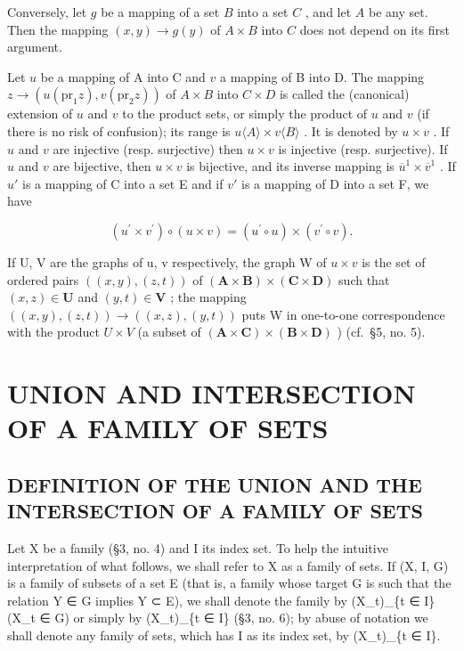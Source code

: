 Conversely, let \(g\) be a mapping of a set \(B\) into a set \(C\) , and let \(A\) be any set. Then the mapping \((x, y) \to g(y)\) of \(A \times B\) into \(C\) does not depend on its first argument.

Let \(u\) be a mapping of A into C and \(v\) a mapping of B into D. The mapping \(z \to (u(\mathrm{pr}_1z), v(\mathrm{pr}_2z))\) of \(A \times B\) into \(C \times D\) is called the (canonical) extension of \(u\) and \(v\) to the product sets, or simply the product of \(u\) and \(v\) (if there is no risk of confusion); its range is \(u\langle A\rangle \times v\langle B\rangle\) . It is denoted by \(u \times v\) . If \(u\) and \(v\) are injective (resp. surjective) then \(u \times v\) is injective (resp. surjective). If \(u\) and \(v\) are bijective, then \(u \times v\) is bijective, and its inverse mapping is \(\overline{u}^1 \times \overline{v}^1\) . If \(u'\) is a mapping of C into a set E and if \(v'\) is a mapping of D into a set F, we have

\[
\left(u ^ {\prime} \times v ^ {\prime}\right) \circ (u \times v) = \left(u ^ {\prime} \circ u\right) \times \left(v ^ {\prime} \circ v\right).
\]

If U, V are the graphs of u, v respectively, the graph W of \(u \times v\) is the set of ordered pairs \(((x, y), (z, t))\) of \((\mathbf{A} \times \mathbf{B}) \times (\mathbf{C} \times \mathbf{D})\) such that \((x, z) \in \mathbf{U}\) and \((y, t) \in \mathbf{V}\) ; the mapping \(((x, y), (z, t)) \to ((x, z), (y, t))\) puts W in one-to-one correspondence with the product \(U \times V\) (a subset of \((\mathbf{A} \times \mathbf{C}) \times (\mathbf{B} \times \mathbf{D})\) ) (cf.~§5, no. 5).

\section{UNION AND INTERSECTION OF A FAMILY OF SETS}

\subsection{DEFINITION OF THE UNION AND THE INTERSECTION OF A FAMILY OF SETS}

Let X be a family (§3, no. 4) and I its index set. To help the intuitive interpretation of what follows, we shall refer to X as a family of sets. If (X, I, G) is a family of subsets of a set E (that is, a family whose target G is such that the relation Y ∈ G implies Y ⊂ E), we shall denote the family by (X\_t)\_\{t ∈ I\}(X\_t ∈ G) or simply by (X\_t)\_\{t ∈ I\} (§3, no. 6); by abuse of notation we shall denote any family of sets, which has I as its index set, by (X\_t)\_\{t ∈ I\}.

